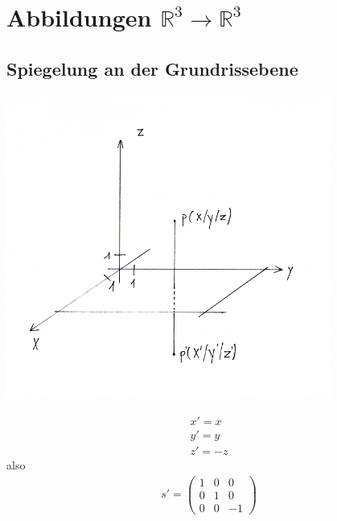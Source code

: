 \documentclass[a4paper,10pt]{report}
\begin{document}
\section{Abbildungen $\mathbb{R}^3 \to \mathbb{R}^3$}
\subsection{Spiegelung an der Grundrissebene}
\begin{center}
	 \includegraphics[width=0.8\textwidth]{imgs/R3spiegelungGrundrissebene.png}
 \end{center}
\begin{eqnarray*}
x' = x\\
y'= y\\
z'=-z
\end{eqnarray*}
also
\begin{eqnarray*}
s'=\begin{pmatrix}1&0&0\\0&1&0\\0&0&-1\end{pmatrix}
\end{eqnarray*}
\newpage
\end{document}
